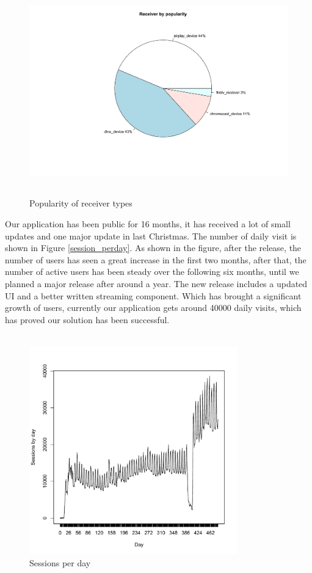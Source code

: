 \\
\begin{figure}[htb]
\centering \includegraphics[height=9cm]{charts/receiver_popularity}
\caption{Popularity of receiver types \label{receiver_types}}
\end{figure}
Our application has been public for 16 months, it has received a lot of small updates and one major update in last Christmas. The number of daily visit is shown in Figure \ref{session_perday}. As shown in the figure, after the release, the number of users has seen a great increase in the first two months, after that, the number of active users has been steady over the following six months, until we planned a major release after around a year. The new release includes a updated UI and a better written streaming component. Which has brought a significant growth of users, currently our application gets around 40000 daily visits, which has proved our solution has been successful.\\
\\
\begin{figure}[htb]
\centering \includegraphics[height=9cm]{charts/sessions_per_day}
\caption{Sessions per day \label{sessions_perday}}
\end{figure}

